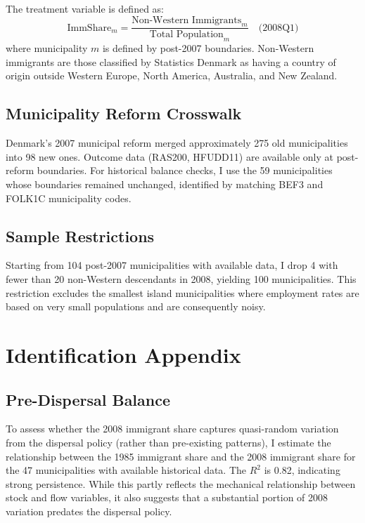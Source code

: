 \documentclass[12pt]{article}
\begin{document}
The treatment variable is defined as:
\[
\text{ImmShare}_m = \frac{\text{Non-Western Immigrants}_m}{\text{Total Population}_m} \quad \text{(2008Q1)}
\]
where municipality $m$ is defined by post-2007 boundaries. Non-Western immigrants are those classified by Statistics Denmark as having a country of origin outside Western Europe, North America, Australia, and New Zealand.

\subsection{Municipality Reform Crosswalk}

Denmark's 2007 municipal reform merged approximately 275 old municipalities into 98 new ones. Outcome data (RAS200, HFUDD11) are available only at post-reform boundaries. For historical balance checks, I use the 59 municipalities whose boundaries remained unchanged, identified by matching BEF3 and FOLK1C municipality codes.

\subsection{Sample Restrictions}

Starting from 104 post-2007 municipalities with available data, I drop 4 with fewer than 20 non-Western descendants in 2008, yielding 100 municipalities. This restriction excludes the smallest island municipalities where employment rates are based on very small populations and are consequently noisy.

\section{Identification Appendix}

\subsection{Pre-Dispersal Balance}

To assess whether the 2008 immigrant share captures quasi-random variation from the dispersal policy (rather than pre-existing patterns), I estimate the relationship between the 1985 immigrant share and the 2008 immigrant share for the 47 municipalities with available historical data. The $R^2$ is 0.82, indicating strong persistence. While this partly reflects the mechanical relationship between stock and flow variables, it also suggests that a substantial portion of 2008 variation predates the dispersal policy.
\end{document}
